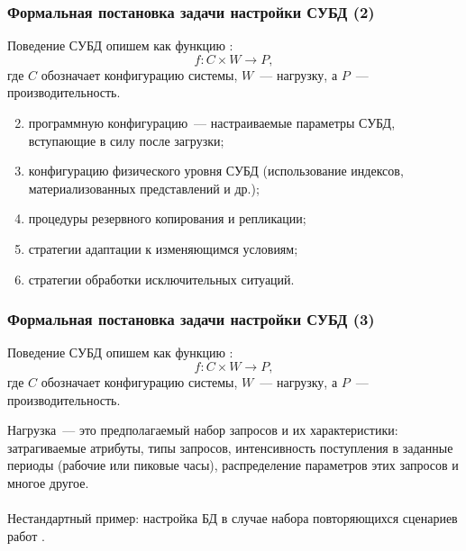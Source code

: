 \documentclass[unicode]{beamer}
\begin{document}
\begin{frame}
\frametitle{Формальная постановка задачи настройки СУБД (2)}

\begin{block}{Поведение СУБД опишем как функцию \cite{p4}:}
$$f: C \times W \rightarrow P,$$
 где $C$ обозначает конфигурацию системы, $W$~--- нагрузку, а $P$~--- производительность. 
\end{block}

\begin{enumerate}
  \setcounter{enumi}{1}
  \item программную конфигурацию~--- настраиваемые параметры СУБД, вступающие в силу после загрузки;
  \item \alert{конфигурацию физического уровня СУБД (использование индексов, материализованных представлений и др.);}
  \item процедуры резервного копирования и репликации;
  \item стратегии адаптации к изменяющимся условиям;
  \item стратегии обработки исключительных ситуаций.
\end{enumerate}
\end{frame}

\begin{frame}
\frametitle{Формальная постановка задачи настройки СУБД (3)}

\begin{block}{Поведение СУБД опишем как функцию \cite{p4}:}
$$f: C \times W \rightarrow P,$$
 где $C$ обозначает конфигурацию системы, $W$~--- нагрузку, а $P$~--- производительность. 
\end{block}

Нагрузка~--- это предполагаемый набор запросов и их характеристики: затрагиваемые атрибуты, типы запросов, интенсивность поступления в заданные периоды (рабочие или пиковые часы), распределение параметров этих запросов и многое другое.
\\~\\
Нестандартный пример: настройка БД в случае набора повторяющихся сценариев работ \cite{p5}.

\end{frame}
\end{document}
